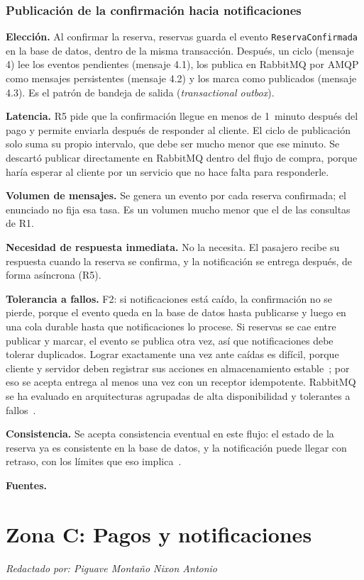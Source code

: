 \documentclass[11pt,a4paper]{article}
\newcommand{\autor}[1]{\par{\small\textit{Redactado por: #1}}\par}
\newcommand{\decision}[8]{\subsubsection*{#1}%
  \textbf{Elección.} #2\par
  \textbf{Latencia.} #3\par
  \textbf{Volumen de mensajes.} #4\par
  \textbf{Necesidad de respuesta inmediata.} #5\par
  \textbf{Tolerancia a fallos.} #6\par
  \textbf{Consistencia.} #7\par
  \textbf{Fuentes.} #8\par}
\newcommand{\integranteC}{Piguave Montaño Nixon Antonio}
\begin{document}
\decision{Publicación de la confirmación hacia notificaciones}
 {Al confirmar la reserva, reservas guarda el evento \texttt{ReservaConfirmada} en la base de datos, dentro de la misma transacción. Después, un ciclo (mensaje 4) lee los eventos pendientes (mensaje 4.1), los publica en RabbitMQ por AMQP como mensajes persistentes (mensaje 4.2) y los marca como publicados (mensaje 4.3). Es el patrón de bandeja de salida (\emph{transactional outbox}).}
 {R5 pide que la confirmación llegue en menos de 1~minuto después del pago y permite enviarla después de responder al cliente. El ciclo de publicación solo suma su propio intervalo, que debe ser mucho menor que ese minuto. Se descartó publicar directamente en RabbitMQ dentro del flujo de compra, porque haría esperar al cliente por un servicio que no hace falta para responderle.}
 {Se genera un evento por cada reserva confirmada; el enunciado no fija esa tasa. Es un volumen mucho menor que el de las consultas de R1.}
 {No la necesita. El pasajero recibe su respuesta cuando la reserva se confirma, y la notificación se entrega después, de forma asíncrona (R5).}
 {F2: si notificaciones está caído, la confirmación no se pierde, porque el evento queda en la base de datos hasta publicarse y luego en una cola durable hasta que notificaciones lo procese. Si reservas se cae entre publicar y marcar, el evento se publica otra vez, así que notificaciones debe tolerar duplicados. Lograr exactamente una vez ante caídas es difícil, porque cliente y servidor deben registrar sus acciones en almacenamiento estable~\cite{ivaki2012exactlyonce}; por eso se acepta entrega al menos una vez con un receptor idempotente. RabbitMQ se ha evaluado en arquitecturas agrupadas de alta disponibilidad y tolerantes a fallos~\cite{rostanski2014rabbitmq}.}
 {Se acepta consistencia eventual en este flujo: el estado de la reserva ya es consistente en la base de datos, y la notificación puede llegar con retraso, con los límites que eso implica~\cite{bailis2013eventual}.}
 {\cite{ivaki2012exactlyonce,rostanski2014rabbitmq,bailis2013eventual}}
 

\section{Zona C: Pagos y notificaciones}\label{sec:zonaC}
\autor{\integranteC}
\end{document}
